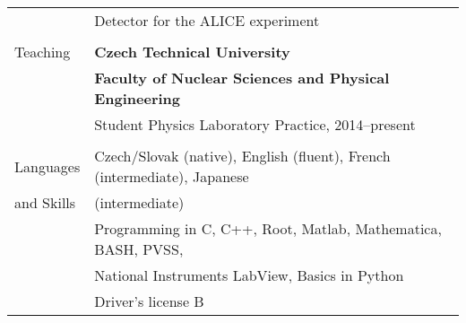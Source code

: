 \documentclass[letterpaper,11pt,oneside]{article}
\begin{document}
\begin{tabular}{@{} l l}
     & Detector for the ALICE experiment \\
     \\
  \Large{Teaching}  & \textbf{Czech Technical University} \\
     & \textbf{Faculty of Nuclear Sciences and Physical Engineering} \\
     & Student Physics Laboratory Practice, 2014--present\\
     & \\
  \Large{Languages}   & Czech/Slovak (native), English (fluent), French (intermediate), Japanese \\
\Large{and Skills}    & (intermediate)  \\[.2cm]
     & Programming in C, C++, Root, Matlab, Mathematica, BASH, PVSS, \\
     &  National Instruments LabView, Basics in Python \\[.2cm]
     & Driver's license B
\end{tabular}

\newpage
\end{document}
